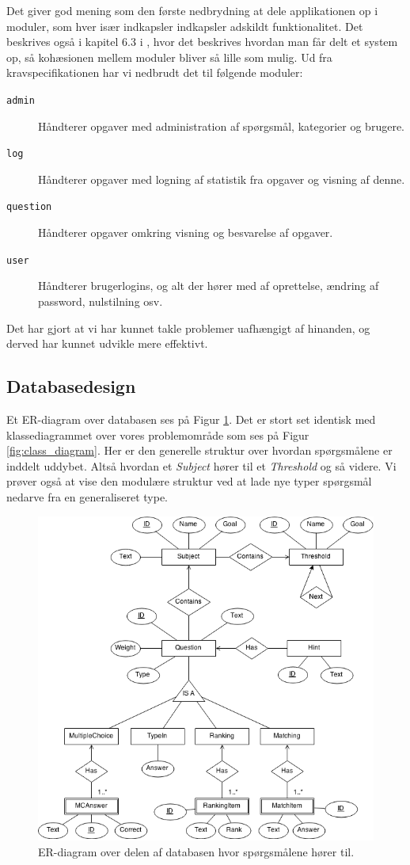\documentclass[11pt, a4paper]{article}
\begin{document}
Det giver god mening som den første nedbrydning at dele applikationen op i moduler, som hver især indkapsler indkapsler adskildt funktionalitet. Det beskrives også i kapitel 6.3 i \cite{OOSE}, hvor det beskrives hvordan man får delt et system op, så kohæsionen mellem moduler bliver så lille som mulig. Ud fra kravspecifikationen har vi nedbrudt det til følgende moduler:
\begin{description}
    \item[\texttt{admin}] Håndterer opgaver med administration af spørgsmål, kategorier og brugere.
    \item[\texttt{log}] Håndterer opgaver med logning af statistik fra opgaver og visning af denne.
    \item[\texttt{question}] Håndterer opgaver omkring visning og besvarelse af opgaver.
    \item[\texttt{user}] Håndterer brugerlogins, og alt der hører med af oprettelse, ændring af password, nulstilning osv.
\end{description}

Det har gjort at vi har kunnet takle problemer uafhængigt af hinanden, og derved har kunnet udvikle mere effektivt.

\subsection{Databasedesign}
\label{sub:databasedesign}
Et ER-diagram over databasen ses på Figur \ref{fig:er_diagram}. Det er stort set identisk med klassediagrammet over vores problemområde som ses på Figur \ref{fig:class_diagram}. Her er den generelle struktur over hvordan spørgsmålene er inddelt uddybet. Altså hvordan et \emph{Subject} hører til et \emph{Threshold} og så videre. Vi prøver også at vise den modulære struktur ved at lade nye typer spørgsmål nedarve fra en generaliseret type.
\begin{figure}[h]
    \centering
    \includegraphics[width=0.8\linewidth]{figures/er_diagram/Qdb.png}
    \caption{ER-diagram over delen af databasen hvor spørgsmålene hører til.}
    \label{fig:er_diagram}
\end{figure}
\end{document}
